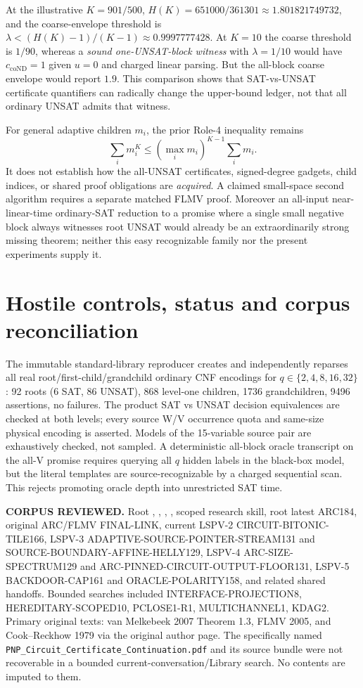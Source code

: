 \documentclass[11pt]{article}
\begin{document}
At the illustrative $K=901/500$, $H(K)=651000/361301\approx1.801821749732$, and the coarse-envelope threshold is $\lambda<(H(K)-1)/(K-1)\approx0.9997777428$. At $K=10$ the coarse threshold is $1/90$, whereas a \emph{sound one-UNSAT-block witness} with $\lambda=1/10$ would have $c_{\mathrm{coND}}=1$ given $u=0$ and charged linear parsing. But the all-block coarse envelope would report $1.9$. This comparison shows that SAT-vs-UNSAT certificate quantifiers can radically change the upper-bound ledger, not that all ordinary UNSAT admits that witness.

For general adaptive children $m_i$, the prior Role-4 inequality \cite{size129} remains
\[
\sum_i m_i^K\le\left(\max_i m_i\right)^{K-1}\sum_i m_i.\tag{8}
\]
It does not establish how the all-UNSAT certificates, signed-degree gadgets, child indices, or shared proof obligations are \emph{acquired}. A claimed small-space second algorithm requires a separate matched FLMV proof. Moreover an all-input near-linear-time ordinary-SAT reduction to a promise where a single small negative block always witnesses root UNSAT would already be an extraordinarily strong missing theorem; neither this easy recognizable family nor the present experiments supply it.

\section{Hostile controls, status and corpus reconciliation}
The immutable standard-library reproducer creates and independently reparses all real root/first-child/grandchild ordinary CNF encodings for $q\in\{2,4,8,16,32\}$: 92 roots (6 SAT, 86 UNSAT), 868 level-one children, 1736 grandchildren, 9496 assertions, no failures. The product SAT vs UNSAT decision equivalences are checked at both levels; every source W/V occurrence quota and same-size physical encoding is asserted. Models of the 15-variable source pair are exhaustively checked, not sampled. A deterministic all-block oracle transcript on the all-V promise requires querying all $q$ hidden labels in the black-box model, but the literal templates are source-recognizable by a charged sequential scan. This rejects promoting oracle depth into unrestricted SAT time.

\textbf{CORPUS REVIEWED.} Root , , , , scoped research skill, root latest ARC184, original ARC/FLMV FINAL-LINK, current LSPV-2 CIRCUIT-BITONIC-TILE166, LSPV-3 ADAPTIVE-SOURCE-POINTER-STREAM131 and SOURCE-BOUNDARY-AFFINE-HELLY129, LSPV-4 ARC-SIZE-SPECTRUM129 and ARC-PINNED-CIRCUIT-OUTPUT-FLOOR131, LSPV-5 BACKDOOR-CAP161 and ORACLE-POLARITY158, and related shared handoffs. Bounded searches included INTERFACE-PROJECTION8, HEREDITARY-SCOPED10, PCLOSE1-R1, MULTICHANNEL1, KDAG2. Primary original texts: van Melkebeek 2007 Theorem 1.3, FLMV 2005, and Cook--Reckhow 1979 via the original author page. The specifically named \texttt{PNP\_Circuit\_Certificate\_Continuation.pdf} and its source bundle were not recoverable in a bounded current-conversation/Library search. No contents are imputed to them.
\end{document}
